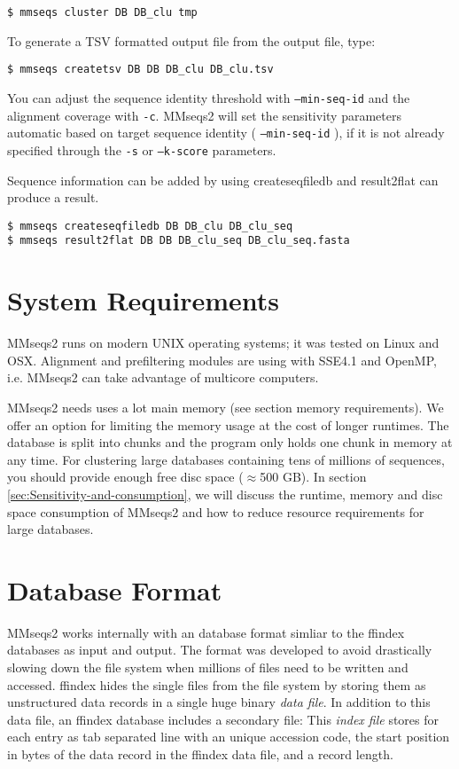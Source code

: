 \documentclass[11pt,a4paper]{scrreprt}
\begin{document}
\begin{verbatim}
$ mmseqs cluster DB DB_clu tmp
\end{verbatim}

To generate a TSV formatted output file from the output file, type:
\begin{verbatim}
$ mmseqs createtsv DB DB DB_clu DB_clu.tsv
\end{verbatim}

You can adjust the sequence identity threshold with \texttt{--min-seq-id} and the alignment coverage with \texttt{-c}. MMseqs2 will set the sensitivity parameters automatic based on target sequence identity ( \texttt{--min-seq-id} ), if it is not already specified through the \texttt{-s} or \texttt{--k-score} parameters.

Sequence information can be added by using createseqfiledb and result2flat can produce a result.

\begin{verbatim}
$ mmseqs createseqfiledb DB DB_clu DB_clu_seq
$ mmseqs result2flat DB DB DB_clu_seq DB_clu_seq.fasta
\end{verbatim}
\section{System Requirements}
MMseqs2 runs on modern UNIX operating systems; it was tested on Linux and OSX. Alignment and prefiltering modules are using with SSE4.1 and OpenMP, i.e. MMseqs2 can take advantage of multicore computers. 

MMseqs2 needs uses a lot main memory (see section memory requirements). We offer an option for limiting the memory usage at the cost of longer runtimes. The database is split into chunks and the program only holds one chunk in memory at any time. For clustering large databases containing tens of millions of sequences, you should provide enough free disc space ($\approx$500 GB). In section \ref{sec:Sensitivity-and-consumption}, we will discuss the runtime, memory and disc space consumption of MMseqs2 and how to reduce resource requirements for large databases.
\section{Database Format}
MMseqs2 works internally with an database format simliar to the ffindex databases as input and output. The format was developed to avoid drastically slowing down the file system when millions of files need to be written and accessed. ffindex hides the single files from the file system by storing them as unstructured data records in a single huge binary \emph{data file}. In addition to this data file, an ffindex database includes a secondary file: This \emph{index file} stores for each entry as tab separated line with an unique accession code, the start position in bytes of the data record in the ffindex data file, and a record length.
\end{document}
